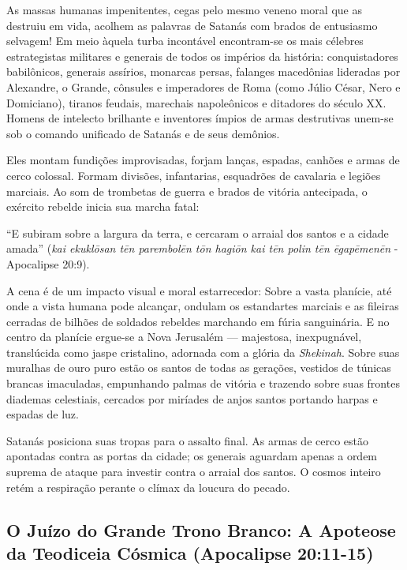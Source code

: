As massas humanas impenitentes, cegas pelo mesmo veneno moral que as destruiu em vida, acolhem as palavras de Satanás com brados de entusiasmo selvagem!
Em meio àquela turba incontável encontram-se os mais célebres estrategistas militares e generais de todos os impérios da história: conquistadores babilônicos, generais assírios, monarcas persas, falanges macedônias lideradas por Alexandre, o Grande, cônsules e imperadores de Roma (como Júlio César, Nero e Domiciano), tiranos feudais, marechais napoleônicos e ditadores do século XX. Homens de intelecto brilhante e inventores ímpios de armas destrutivas unem-se sob o comando unificado de Satanás e de seus demônios.

Eles montam fundições improvisadas, forjam lanças, espadas, canhões e armas de cerco colossal. Formam divisões, infantarias, esquadrões de cavalaria e legiões marciais. Ao som de trombetas de guerra e brados de vitória antecipada, o exército rebelde inicia sua marcha fatal:

``E subiram sobre a largura da terra, e cercaram o arraial dos santos e a cidade amada'' (\textit{kai ekuklōsan tēn parembolēn tōn hagiōn kai tēn polin tēn ēgapēmenēn} - Apocalipse 20:9).

A cena é de um impacto visual e moral estarrecedor:
Sobre a vasta planície, até onde a vista humana pode alcançar, ondulam os estandartes marciais e as fileiras cerradas de bilhões de soldados rebeldes marchando em fúria sanguinária.
E no centro da planície ergue-se a Nova Jerusalém — majestosa, inexpugnável, translúcida como jaspe cristalino, adornada com a glória da \textit{Shekinah}. Sobre suas muralhas de ouro puro estão os santos de todas as gerações, vestidos de túnicas brancas imaculadas, empunhando palmas de vitória e trazendo sobre suas frontes diademas celestiais, cercados por miríades de anjos santos portando harpas e espadas de luz.

Satanás posiciona suas tropas para o assalto final. As armas de cerco estão apontadas contra as portas da cidade; os generais aguardam apenas a ordem suprema de ataque para investir contra o arraial dos santos. O cosmos inteiro retém a respiração perante o clímax da loucura do pecado.



\subsection{O Juízo do Grande Trono Branco: A Apoteose da Teodiceia Cósmica (Apocalipse 20:11-15)}


